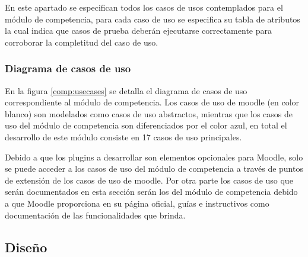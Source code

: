  En este apartado se especifican todos los casos de usos contemplados para el módulo de
competencia, para cada caso de uso se especifica su tabla de atributos la cual indica que casos
 de prueba deberán ejecutarse correctamente para corroborar la completitud del caso de uso.

\subsubsection*{Diagrama de casos de uso}

 En la figura \ref{comp:usecases} se detalla el diagrama de casos de uso correspondiente al módulo
 de competencia. Los casos de uso de moodle (en color blanco) son modelados como casos de uso
 abstractos, mientras que los casos de uso del módulo de competencia son diferenciados por el
 color azul, en total el desarrollo de este módulo consiste en 17 casos de uso principales.


 \noindent
 Debido a que los plugins a desarrollar son elementos opcionales para Moodle, solo se puede
 acceder a los casos de uso del módulo de competencia a través de puntos de extensión de los
 casos de uso de moodle. Por otra parte los casos de uso que serán documentados en esta sección
 serán los del módulo de competencia debido a que Moodle proporciona en su página oficial, guías
 e instructivos como documentación de las funcionalidades que brinda.


















\clearpage
\subsection{Diseño}

